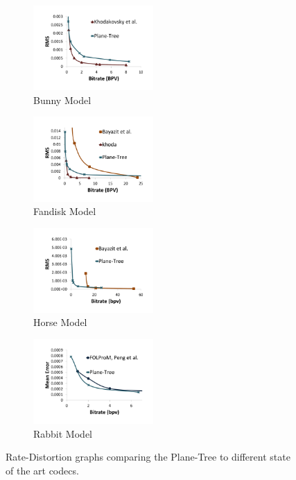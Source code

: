 \begin{figure}[t!] 
        \centering
        \begin{subfigure}[b]{1.8in}
                \includegraphics[width=1.8in]{images/results/compression/bunnysota}
                \caption{Bunny Model}
                \label{fig:SA_BUNNY}
        \end{subfigure}%
        \begin{subfigure}[b]{1.8in}
                \includegraphics[width=1.8in]{images/results/compression/fandisksota}
                \caption{Fandisk Model}
                \label{fig:SA_FANDISK}
        \end{subfigure}
        
        \begin{subfigure}[b]{1.8in}
                \includegraphics[width=1.8in]{images/results/compression/horsesota}
                \caption{Horse Model}
                \label{fig:SA_HORSE}
        \end{subfigure}%
        \begin{subfigure}[b]{1.8in}
                \includegraphics[width=1.8in]{images/results/compression/rabbitsota}
                \caption{Rabbit Model}
                \label{fig:SA_RABBIT}
        \end{subfigure}
       \caption{Rate-Distortion graphs comparing the Plane-Tree to different state of the art codecs.}
       \label{fig:SOTAEXPS}
\end{figure}

